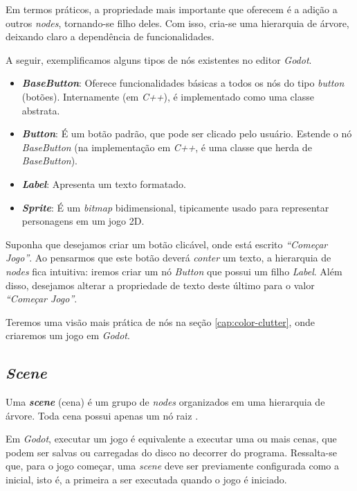 Em termos práticos, a propriedade mais importante que oferecem é a adição a outros \textit{nodes}, tornando-se filho deles. Com isso, cria-se uma hierarquia de árvore, deixando claro a dependência de funcionalidades.

A seguir, exemplificamos alguns tipos de nós existentes no editor \textit{Godot}.

\begin{itemize}
\item \textbf{\textit{BaseButton}}: Oferece funcionalidades básicas a todos os nós do tipo \textit{button} (botões). Internamente (em \textit{C++}), é implementado como uma classe abstrata.

\item \textbf{\textit{Button}}: É um botão padrão, que pode ser clicado pelo usuário. Estende o nó \textit{BaseButton} (na implementação em \textit{C++}, é uma classe que herda de \textit{BaseButton}).

\item \textbf{\textit{Label}}: Apresenta um texto formatado.

\item \textbf{\textit{Sprite}}: É um \textit{bitmap} bidimensional, tipicamente usado para representar personagens em um jogo 2D.
\end{itemize}

Suponha que desejamos criar um botão clicável, onde está escrito \textit{``Começar Jogo''}. Ao pensarmos que este botão deverá \emph{conter} um texto, a hierarquia de \textit{nodes} fica intuitiva: iremos criar um nó \textit{Button} que possui um filho \textit{Label}. Além disso, desejamos alterar a propriedade de texto deste último para o valor \textit{``Começar Jogo''}.

Teremos uma visão mais prática de nós na seção \ref{cap:color-clutter}, onde criaremos um jogo em \textit{Godot}.


\subsection{\textit{Scene}}

Uma \textbf{\textit{scene}} (cena) é um grupo de \textit{nodes} organizados em uma hierarquia de árvore. Toda cena possui apenas um nó raiz \citep{godotScene}.

Em \textit{Godot}, executar um jogo é equivalente a executar uma ou mais cenas, que podem ser salvas ou carregadas do disco no decorrer do programa. Ressalta-se que, para o jogo começar, uma \textit{scene} deve ser previamente configurada como a inicial, isto é, a primeira a ser executada quando o jogo é iniciado.

